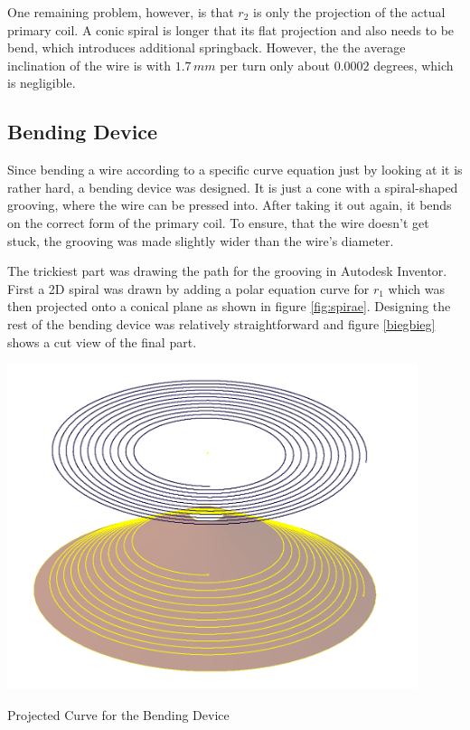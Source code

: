 One remaining problem, however, is that \(r_2\) is only the projection of the actual primary coil. A conic spiral is longer that its flat projection and also needs to be bend, which introduces additional springback. However, the the average inclination of the wire is with \(1.7\,mm\) per turn only about \(0.0002\) degrees, which is negligible.

\subsection{Bending Device}

Since bending a wire according to a specific curve equation just by looking at it is rather hard, a bending device was designed. It is just a cone with a spiral-shaped grooving, where the wire can be pressed into. After taking it out again, it bends on the correct form of the primary coil. To ensure, that the wire doesn't get stuck, the grooving was made slightly wider than the wire's diameter.

The trickiest part was drawing the path for the grooving in Autodesk Inventor. First a 2D spiral was drawn by adding a polar equation curve for \(r_1\) which was then projected onto a conical plane as shown in figure \ref{fig:spirae}. Designing the rest of the bending device was relatively straightforward and figure \ref{biegbieg} shows a cut view of the final part. %

\begin{marginfigure}[-3cm]
    \centering
    \includegraphics[width=0.9\textwidth]{kassandra/resources/JerJerWoBistDuSpirae.PNG}
    \caption{Projected Curve for the Bending Device}
    \label{fig:spirae}
\end{marginfigure}

